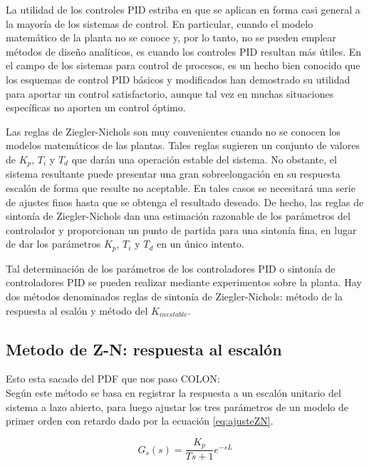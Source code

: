 \documentclass[10pt,conference,a4paper,onecolumn]{article}%
\begin{document}
La utilidad de los controles PID estriba en que se aplican en forma casi general a la mayoría de los sistemas de control. En particular, cuando el modelo matemático de la planta no se conoce y, por lo tanto, no se pueden emplear métodos de diseño analíticos, es cuando los controles PID resultan más útiles. En el campo de los sistemas para control de procesos, es un hecho bien conocido que los esquemas de control PID básicos y modificados han demostrado su utilidad para aportar un control satisfactorio, aunque tal vez en muchas situaciones específicas no aporten un control óptimo.

Las reglas de Ziegler-Nichols son muy convenientes cuando no se conocen los modelos matemáticos de las plantas. Tales reglas sugieren un conjunto de valores de $K_p$, $T_i$ y $T_d$ que darán una operación estable del sistema. No obstante, el sistema resultante puede presentar una gran sobreelongación en su respuesta escalón de forma que resulte no aceptable. En tales casos se necesitará una serie de ajustes finos hasta que se obtenga el resultado deseado. De hecho, las reglas de sintonía de Ziegler-Nichols dan una estimación razonable de los parámetros del controlador y proporcionan un punto de partida para una sintonía fina, en lugar de dar los parámetros $K_p$, $T_i$ y $T_d$ en un único intento.

Tal determinación de los parámetros de los controladores PID o sintonía de controladores PID se pueden realizar mediante experimentos sobre la planta. Hay dos métodos denominados reglas de sintonía de Ziegler-Nichols: método de la respuesta al esalón y método del $K_{inestable}$.  

\subsection{Metodo de Z-N: respuesta al escalón}
Esto esta sacado del PDF que nos paso COLON:\\

Según \cite{biblia_PID} este método se basa en registrar la respuesta a un escalón
unitario del sistema a lazo abierto, para luego ajustar los tres parámetros de un modelo
de primer orden con retardo dado por la ecuación \ref{eq:ajusteZN}.

\begin{equation}
G_s(s)=\frac{K_p}{Ts+1}e^{-sL}
\label{eq:ajusteZN}
\end{equation}
\end{document}
